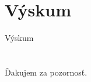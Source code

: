 \documentclass[pdf]{beamer}
\begin{document}
\section{Výskum}
\begin{frame}{Výskum}
    
\end{frame}

    

    

\section*{}
\begin{frame}{}
    Ďakujem za pozornosť.
\end{frame}
\end{document}
